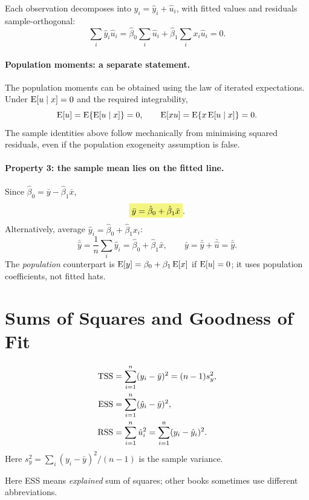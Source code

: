 Each observation decomposes into $y_i=\hat y_i+\hat u_i$, with fitted values and residuals sample-orthogonal:
\[\sum_i\hat y_i\hat u_i
=\hat\beta_0\sum_i\hat u_i+\hat\beta_1\sum_i x_i\hat u_i=0.\]

\paragraph{Population moments: a separate statement.}
The population moments can be obtained using the law of iterated expectations. Under $\operatorname{E}[u\mid x]=0$ and the required integrability,
\[\operatorname{E}[u]=\operatorname{E}\{\operatorname{E}[u\mid x]\}=0,\qquad
\operatorname{E}[xu]=\operatorname{E}\{x\operatorname{E}[u\mid x]\}=0.\]
 The sample identities above follow mechanically from minimising squared residuals, even if the population exogeneity assumption is false.

\paragraph{Property 3: the sample mean lies on the fitted line.}
Since $\hat\beta_0=\bar y-\hat\beta_1\bar x$,
\[\hm{\bar y=\hat\beta_0+\hat\beta_1\bar x}.\]
Alternatively, average $\hat y_i=\hat\beta_0+\hat\beta_1x_i$:
\[\bar{\hat y}=\frac1n\sum_i\hat y_i=\hat\beta_0+\hat\beta_1\bar x,
\qquad\bar y=\bar{\hat y}+\bar{\hat u}=\bar{\hat y}.\]
The \emph{population} counterpart is $\operatorname{E}[y]=\beta_0+\beta_1\operatorname{E}[x]$ if $\operatorname{E}[u]=0$; it uses population coefficients, not fitted hats.

\section{Sums of Squares and Goodness of Fit}
\label{sec:ss-decomposition}
\begin{definition}
\begin{align}
\operatorname{TSS}&=\sum_{i=1}^n(y_i-\bar y)^2=(n-1)s_y^2,\label{eq:tss}\\
\operatorname{ESS}&=\sum_{i=1}^n(\hat y_i-\bar y)^2,\label{eq:ess}\\
\operatorname{RSS}&=\sum_{i=1}^n\hat u_i^2=\sum_{i=1}^n(y_i-\hat y_i)^2.\label{eq:rss}
\end{align}
Here $s_y^2=\sum_i(y_i-\bar y)^2/(n-1)$ is the sample variance.
\end{definition}
 Here ESS means \emph{explained} sum of squares; other books sometimes use different abbreviations.

